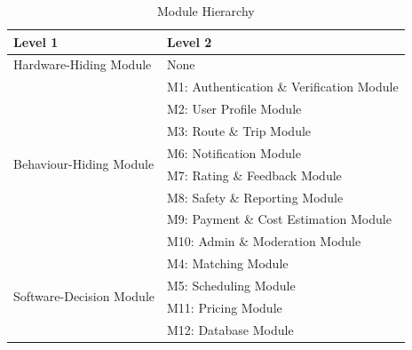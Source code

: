 \begin{table}[h!]
\centering
\begin{tabular}{p{} p{}}
\toprule
\textbf{Level 1} & \textbf{Level 2}\\
\midrule
Hardware-Hiding Module & None\\
\midrule
\multirow{8}{0.3\textwidth}{Behaviour-Hiding Module}
& M1: Authentication \& Verification Module\\
& M2: User Profile Module\\
& M3: Route \& Trip Module\\
& M6: Notification Module\\
& M7: Rating \& Feedback Module\\
& M8: Safety \& Reporting Module\\
& M9: Payment \& Cost Estimation Module\\
& M10: Admin \& Moderation Module\\
\midrule
\multirow{4}{0.3\textwidth}{Software-Decision Module}
& M4: Matching Module\\
& M5: Scheduling Module\\
& M11: Pricing Module\\
& M12: Database Module\\
\bottomrule
\end{tabular}
\caption{Module Hierarchy}
\label{TblMH}
\end{table}